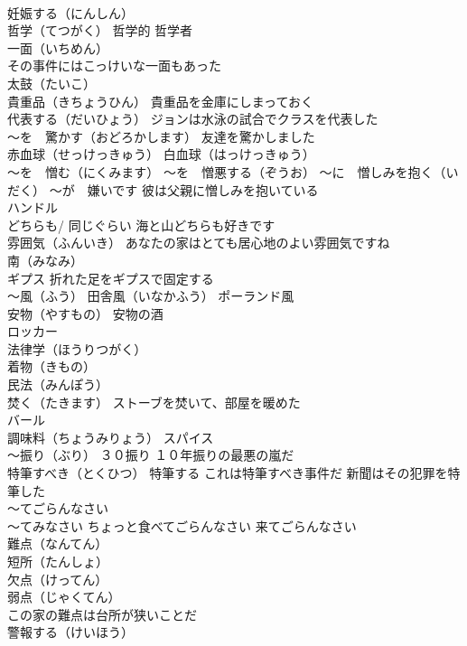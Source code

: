 \documentclass[8pt]{extreport}
\begin{document}
\begin{CJK}{UTF8}{min}
\\	妊娠する（にんしん）
\\	哲学（てつがく） 哲学的 哲学者
\\	一面（いちめん） 
\\	その事件にはこっけいな一面もあった
\\	太鼓（たいこ）
\\	貴重品（きちょうひん） 貴重品を金庫にしまっておく
\\	代表する（だいひょう） ジョンは水泳の試合でクラスを代表した
\\	～を　驚かす（おどろかします） 友達を驚かしました
\\	赤血球（せっけっきゅう） 白血球（はっけっきゅう）
\\	～を　憎む（にくみます） ～を　憎悪する（ぞうお） ～に　憎しみを抱く（いだく） ～が　嫌いです 彼は父親に憎しみを抱いている
\\	ハンドル
\\	どちらも/ 同じぐらい 海と山どちらも好きです
\\	雰囲気（ふんいき） あなたの家はとても居心地のよい雰囲気ですね
\\	南（みなみ）
\\	ギプス 折れた足をギプスで固定する
\\	～風（ふう） 田舎風（いなかふう） ポーランド風
\\	安物（やすもの） 安物の酒
\\	ロッカー
\\	法律学（ほうりつがく）
\\	着物（きもの）
\\	民法（みんぽう）
\\	焚く（たきます） ストーブを焚いて、部屋を暖めた
\\	バール 
\\	調味料（ちょうみりょう） スパイス
\\	～振り（ぶり） ３０振り １０年振りの最悪の嵐だ
\\	特筆すべき（とくひつ） 特筆する これは特筆すべき事件だ 新聞はその犯罪を特筆した
\\	～てごらんなさい 
\\	～てみなさい ちょっと食べてごらんなさい 来てごらんなさい
\\	難点（なんてん）
\\	短所（たんしょ）
\\	欠点（けってん）
\\	弱点（じゃくてん）
\\	この家の難点は台所が狭いことだ
\\	警報する（けいほう）

\end{CJK}
\end{document}
